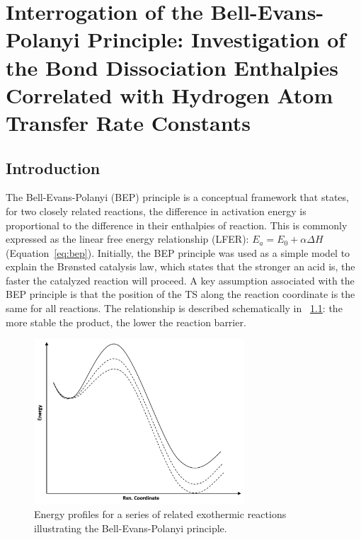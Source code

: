 
\chapter{Interrogation of the Bell-Evans-Polanyi Principle: Investigation of
the Bond Dissociation Enthalpies Correlated with Hydrogen Atom Transfer Rate
Constants} \label{ch:bde}

\section{Introduction}

The Bell-Evans-Polanyi (BEP) principle is a conceptual framework that states,
for two closely related reactions, the difference in activation energy is
proportional to the difference in their enthalpies of
reaction.\cite{Bell1936,Evans1938,Dill2003} This is commonly expressed as the
linear free energy relationship (LFER): $E_a = E_0 + \alpha \Delta H$
(Equation~\ref{eq:bep}). Initially, the BEP principle was used as a simple model
to explain the Br{\o}nsted catalysis law, which states that the stronger an acid
is, the faster the catalyzed reaction will proceed.\cite{Bronsted1924} A key
assumption associated with the BEP principle is that the position of the TS
along the reaction coordinate is the same for all reactions. The relationship is
described schematically in ~\ref{fig:bep}: the more stable the product, the
lower the reaction barrier.

\begin{figure}[!htbp]
  \centering
  \includegraphics[width=0.7\textwidth]{figures/bep}
  \caption{Energy profiles for a series of related exothermic reactions
  illustrating the Bell-Evans-Polanyi principle.} \label{fig:bep}
\end{figure}


